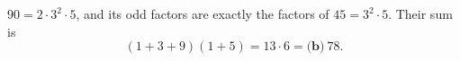$90=2\cdot3^2\cdot5$, and its odd factors are exactly the factors of $45=3^2\cdot5$. Their sum is
\[
(1+3+9)(1+5)=13\cdot6=\boxed{\textbf{(b)}\ 78}.
\]
